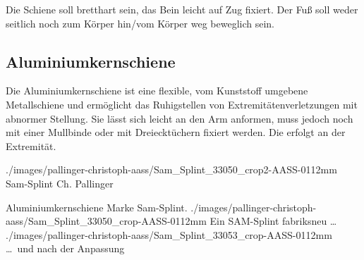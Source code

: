 Die Schiene soll bretthart sein, das Bein leicht auf Zug
fixiert. Der Fuß soll weder seitlich noch zum Körper hin/vom
Körper weg beweglich sein.


\subsection{Aluminiumkernschiene}
\label{topic:sam-splint-anwendung}
\label{topic:aluminiumkernschiene}
\label{topic:schienung-arm}
\label{topic:sam-splint-beschreibung}



{%
Die Aluminiumkernschiene ist eine flexible, vom Kunststoff
umgebene Metallschiene und ermöglicht das Ruhigstellen von
Extremitätenverletzungen mit abnormer Stellung. Sie lässt
sich leicht an den Arm anformen, muss jedoch noch mit einer
Mullbinde oder mit Dreiecktüchern fixiert werden. Die
 erfolgt an der  Extremität.
}{

}
{./images/pallinger-christoph-aass/Sam_Splint_33050_crop2-AASS-0112mm}
{Sam-Splint{\protect\texttrademark}}
{Ch. Pallinger}

\begin{PictureSeries}{}{Aluminiumkernschiene Marke Sam-Splint{\texttrademark}. }
{./images/pallinger-christoph-aass/Sam_Splint_33050_crop-AASS-0112mm}
{Ein SAM-Splint{\texttrademark} fabriksneu \ldots}
{./images/pallinger-christoph-aass/Sam_Splint_33053_crop-AASS-0112mm}
{\ldots\  und nach der Anpassung}
{}{}{}{}
\end{PictureSeries}

\begin{ProcedureStepsNoHeading}


\end{ProcedureStepsNoHeading}

